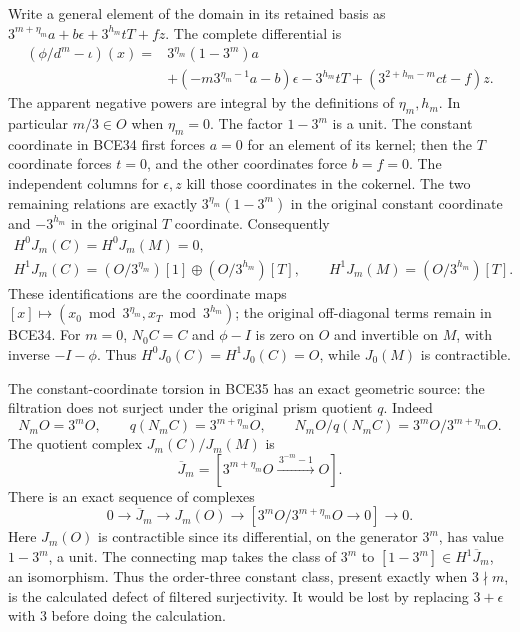 Write a general element of the domain in its retained basis as
\(3^{m+\eta_m}a+b\epsilon+3^{h_m}tT+fz\).
The complete differential is
\begin{equation}\tag{BCE34}
\begin{split}
(\phi/d^m-\iota)(x)
={}&3^{\eta_m}(1-3^m)a\\
&+(-m3^{\eta_m-1}a-b)\epsilon
-3^{h_m}tT+(3^{2+h_m-m}ct-f)z .
\end{split}
\end{equation}
The apparent negative powers are integral by the definitions
of \(\eta_m,h_m\). In particular \(m/3\in O\) when
\(\eta_m=0\). The factor \(1-3^m\) is a unit.
The constant coordinate in BCE34 first forces \(a=0\)
for an element of its kernel; then the \(T\) coordinate forces
\(t=0\), and the other coordinates force \(b=f=0\).
The independent columns for \(\epsilon,z\) kill those
coordinates in the cokernel. The two remaining relations
are exactly \(3^{\eta_m}(1-3^m)\) in the original constant
coordinate and \(-3^{h_m}\) in the original \(T\) coordinate.
Consequently
\begin{equation}\tag{BCE35}
\begin{gathered}
H^0J_m(C)=H^0J_m(M)=0,\\
H^1J_m(C)=(O/3^{\eta_m})[1]\oplus(O/3^{h_m})[T],
\qquad H^1J_m(M)=(O/3^{h_m})[T].
\end{gathered}
\end{equation}
These identifications are the coordinate maps
\([x]\mapsto(x_0\bmod3^{\eta_m},x_T\bmod3^{h_m})\);
the original off-diagonal terms remain in BCE34.
For \(m=0\), \(N_0C=C\) and \(\phi-I\) is zero on \(O\)
and invertible on \(M\), with inverse \(-I-\phi\).
Thus \(H^0J_0(C)=H^1J_0(C)=O\), while \(J_0(M)\)
is contractible.

The constant-coordinate torsion in BCE35 has an exact
geometric source: the filtration does not surject under
the original prism quotient \(q\). Indeed
\begin{equation}\tag{BCE36}
N_mO=3^mO,\qquad q(N_mC)=3^{m+\eta_m}O,\qquad
N_mO/q(N_mC)=3^mO/3^{m+\eta_m}O .
\end{equation}
The quotient complex \(J_m(C)/J_m(M)\) is
\[
\overline J_m=
[3^{m+\eta_m}O\xrightarrow{\,3^{-m}-1\,}O].
\]
There is an exact sequence of complexes
\begin{equation}\tag{BCE37}
0\longrightarrow\overline J_m\longrightarrow
J_m(O)\longrightarrow
[3^mO/3^{m+\eta_m}O\longrightarrow0]
\longrightarrow0 .
\end{equation}
Here \(J_m(O)\) is contractible since its differential,
on the generator \(3^m\), has value \(1-3^m\), a unit.
The connecting map takes the class of \(3^m\) to
\([1-3^m]\in H^1\overline J_m\), an isomorphism.
Thus the order-three constant class, present exactly when
\(3\nmid m\), is the calculated defect of filtered
surjectivity. It would be lost by replacing \(3+\epsilon\)
with \(3\) before doing the calculation.

